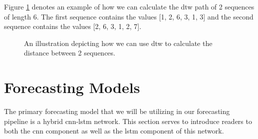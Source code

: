 \noindent Figure \ref{fig:DTW-Illustration} denotes an example of how we can calculate the \gls{dtw} path of 2 sequences of length 6. The first sequence contains the values [1, 2, 6, 3, 1, 3] and the second sequence contains the values [2, 6, 3, 1, 2, 7].

\begin{figure}[hbt!]
        \begin{adjustwidth}{-0.5cm}{-0.5cm}%
                \myfloatalign
                 \quad
                 \quad
                \caption{An illustration depicting how we can use \gls{dtw} to calculate the distance between 2 sequences.}
                \label{fig:DTW-Illustration}
        \end{adjustwidth}
\end{figure}

\section{Forecasting Models}
\label{sec:Background-Information:Forecasting-Models}
The primary forecasting model that we will be utilizing in our forecasting pipeline is a hybrid \gls{cnn-lstm} network. This section serves to introduce readers to both the \gls{cnn} component as well as the \gls{lstm} component of this network.

